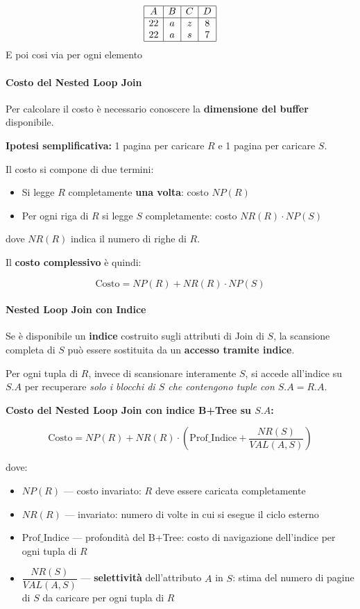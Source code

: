 \[
\begin{array}{|c|c|c|c|}
	\hline
	A & B & C & D \\
	\hline
	22 & a & z & 8 \\
	22 & a & s & 7 \\
	\hline
\end{array}
\]
E poi cosi via per ogni elemento
\paragraph{Costo del Nested Loop Join}

Per calcolare il costo è necessario conoscere la \textbf{dimensione del buffer} disponibile.

\bigskip
\noindent\textbf{Ipotesi semplificativa:} 1 pagina per caricare $R$ e 1 pagina per caricare $S$.

\bigskip
\noindent Il costo si compone di due termini:
\begin{itemize}
	\item Si legge $R$ completamente \textbf{una volta}: costo $NP(R)$
	\item Per ogni riga di $R$ si legge $S$ completamente: costo $NR(R) \cdot NP(S)$
\end{itemize}

dove $NR(R)$ indica il numero di righe di $R$.

\bigskip
\noindent Il \textbf{costo complessivo} è quindi:

\[
\text{Costo} = NP(R) + NR(R) \cdot NP(S)
\]
\paragraph{Nested Loop Join con Indice}

Se è disponibile un \textbf{indice} costruito sugli attributi di Join di $S$, la scansione completa di $S$ può essere sostituita da un \textbf{accesso tramite indice}.

\bigskip
\noindent Per ogni tupla di $R$, invece di scansionare interamente $S$, si accede all'indice su $S.A$ per recuperare \textit{solo i blocchi di $S$ che contengono tuple con $S.A = R.A$}.

\bigskip
\noindent\textbf{Costo del Nested Loop Join con indice B+Tree su $S.A$:}

\[
\text{Costo} = NP(R) + NR(R) \cdot \left(\text{Prof\_Indice} + \frac{NR(S)}{VAL(A,S)}\right)
\]

dove:
\begin{itemize}
	\item $NP(R)$ — costo invariato: $R$ deve essere caricata completamente
	\item $NR(R)$ — invariato: numero di volte in cui si esegue il ciclo esterno
	\item $\text{Prof\_Indice}$ — profondità del B+Tree: costo di navigazione dell'indice per ogni tupla di $R$
	\item $\dfrac{NR(S)}{VAL(A,S)}$ — \textbf{selettività} dell'attributo $A$ in $S$: stima del numero di pagine di $S$ da caricare per ogni tupla di $R$
\end{itemize}

